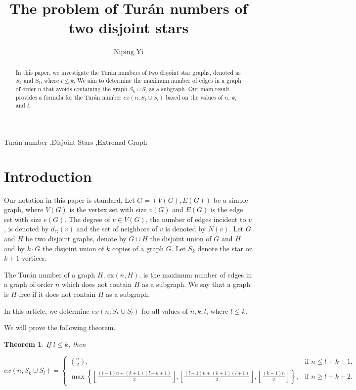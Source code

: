 \documentclass[12pt]{elsarticle}
\newtheorem{theorem}{Theorem}
\begin{document}
\begin{frontmatter}

\title{The problem of Turán numbers of two disjoint stars }

\author{Niping Yi}


\begin{abstract}
    In this paper, we investigate the Turán numbers of two disjoint star graphs, denoted as \( S_k \) and \( S_l \), where \( l \le k \). We aim to determine the maximum number of edges in a graph of order \( n \) that avoids containing the graph \( S_k \cup S_l \) as a subgraph. Our main result provides a formula for the Turán number \( ex(n, S_k \cup S_l) \) based on the values of \( n \), \( k \), and \( l \).  
    \end{abstract}

\begin{keyword}
Turán number \sep Disjoint Stars \sep Extremal Graph
\end{keyword}

\end{frontmatter}

\section{Introduction}
Our notation in this paper is standard. Let \( G = (V(G), E(G)) \) be a simple graph, where \( V(G) \) is the vertex set with size \( v(G) \) and \( E(G) \) is the edge set with size \( e(G) \). The degree of \( v \in V(G) \), the number of edges incident to \( v \), is denoted by \( d_G(v) \) and the set of neighbors of \( v \) is denoted by \( N(v) \).  Let \( G \) and \( H \) be two disjoint graphs, denote by \( G \cup H \) the disjoint union of \( G \) and \( H \) and by \( k \cdot G \) the disjoint union of \( k \) copies of a graph \( G \). Let \( S_k \) denote the star on \( k + 1 \) vertices. 

The Turán number of a graph \( H \), \( \text{ex}(n, H) \), is the maximum number of edges in a graph of order \( n \) which does not contain \( H \) as a subgraph. We say that a graph is \( H \)-free if it does not contain \( H \) as a subgraph.

In this article, we determine \( ex(n, S_k \cup S_l) \) for all values of \( n, k, l \), where \( l \le k \).


We will prove the following theorem.

\begin{theorem}\label{thm1}
    If $l \le k$, then
    \begin{footnotesize}
    \[
    ex(n, S_{k} \cup S_{l}) = 
    \begin{cases} 
    \binom{n}{2}, & \text{if } n \le l + k + 1, \\
    \max\left\{\left\lfloor \frac{(l-1)n+(k+1)(l+k+1)}{2} \right\rfloor, \left\lfloor \frac{(l+1)n+(k+1)(l+1)}{2} \right\rfloor, \left\lfloor \frac{(k-1)n}{2} \right\rfloor\right\}, & \text{if } n \ge l + k + 2.
    \end{cases}
    \]
\end{footnotesize}
    \end{theorem}
\end{document}
